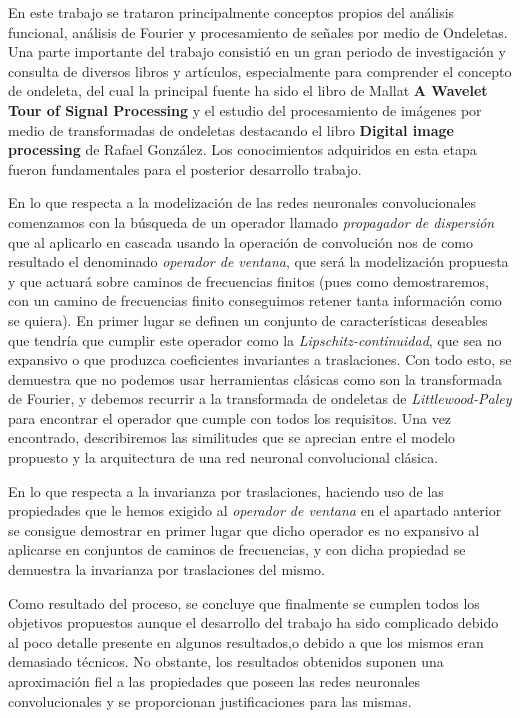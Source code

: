 \medskip
\noindent En este trabajo se trataron principalmente conceptos propios del análisis funcional, análisis de Fourier y procesamiento de señales por medio de Ondeletas. Una parte importante del trabajo consistió en un gran periodo de investigación y consulta de diversos libros y artículos, especialmente para comprender el concepto de ondeleta, del cual la principal fuente ha sido el libro de Mallat \textbf{A Wavelet Tour of Signal Processing} y el estudio del procesamiento de imágenes por medio de transformadas de ondeletas destacando el libro \textbf{Digital image processing} de Rafael González. Los conocimientos adquiridos en esta etapa fueron fundamentales para el posterior desarrollo trabajo.


\medskip

\noindent En lo que respecta a la modelización de las redes neuronales convolucionales comenzamos con la búsqueda de un operador llamado \textit{propagador de dispersión} que al aplicarlo en cascada usando la operación de convolución nos de como resultado el denominado \textit{operador de ventana}, que será la modelización propuesta y que actuará sobre caminos de frecuencias finitos (pues como demostraremos, con un camino de frecuencias finito conseguimos retener tanta información como se quiera). En primer lugar se definen un conjunto de características deseables que tendría que cumplir este operador como la \textit{Lipschitz-continuidad}, que sea no expansivo o que produzca coeficientes invariantes a traslaciones. Con todo esto, se demuestra que no podemos usar herramientas clásicas como son la transformada de Fourier, y debemos recurrir a la transformada de ondeletas de \textit{Littlewood-Paley} para encontrar el operador que cumple con todos los requisitos. Una vez encontrado, describiremos las similitudes que se aprecian entre el modelo propuesto y la arquitectura de una red neuronal convolucional clásica. 

\medskip

\noindent En lo que respecta a la invarianza por traslaciones, haciendo uso de las propiedades que le hemos exigido al \textit{operador de ventana} en el apartado anterior se consigue demostrar en primer lugar que dicho operador es no expansivo al aplicarse en conjuntos de caminos de frecuencias, y con dicha propiedad se demuestra la invarianza por traslaciones del mismo.

\medskip
\noindent Como resultado del proceso, se concluye que finalmente se cumplen todos los objetivos propuestos aunque el desarrollo del trabajo ha sido complicado debido al poco detalle presente en algunos resultados,o debido a que los mismos eran demasiado técnicos. No obstante, los resultados obtenidos suponen una aproximación fiel a las propiedades que poseen las redes neuronales convolucionales y se proporcionan justificaciones para las mismas.

